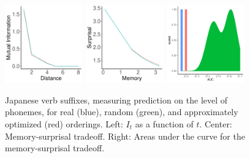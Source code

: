 \begin{figure}
	\begin{center}
\includegraphics[width=0.3\textwidth]{figures/Japanese-suffixes-byPhonemes-it-heldout.pdf}
\includegraphics[width=0.3\textwidth]{figures/Japanese-suffixes-byPhonemes-memsurp-heldout.pdf}
\includegraphics[width=0.3\textwidth]{figures/Japanese-suffixes-byPhonemes-auc-hist-heldout.pdf}
\end{center}
	\caption{Japanese verb suffixes, measuring prediction on the level of phonemes, for real (blue), random (green), and approximately optimized (red) orderings. Left: $I_t$ as a function of $t$. Center: Memory-surprisal tradeoff. Right: Areas under the curve for the memory-surprisal tradeoff.}\label{fig:jap-phon}
\end{figure}


